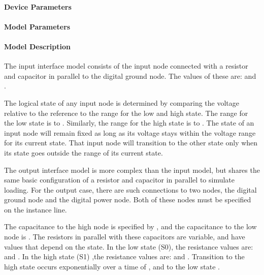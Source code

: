 \paragraph{Device Parameters}



\paragraph{Model Parameters}



\paragraph{Model Description}

The input interface model consists of the input node connected with a resistor and
capacitor in parallel to the digital ground node.  The values of these are: 
and .  

The logical state of any input node is determined by comparing the voltage relative
to the reference to the range for the low and high state.  The range for the low
state is  to .  Similarly, the range for the high state
is  to .  The state of an input node will remain fixed as
long as its voltage stays within the voltage range for its current state.  That input node
will transition to the other state only when its state goes outside the range of its
current state.

The output interface model is more complex than the input model, but shares the same
basic configuration of a resistor and capacitor in parallel to simulate loading.  For
the output case, there are such connections to two nodes, the digital ground node and the
digital power node.  Both of these nodes must be specified on the instance line.

The capacitance to the high node is specified by , and the capacitance to the low
node is .  The resistors in parallel with these capacitors are variable, and have
values that depend on the state.  In the low state (S0), the resistance values are:
 and .  In the high state (S1) ,the resistance values are: 
 and .  Transition to the high state occurs exponentially over
a time of , and to the low state .


